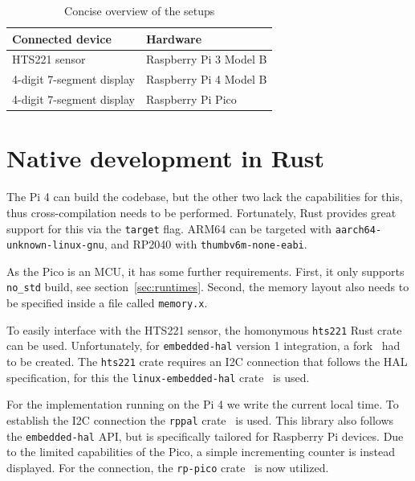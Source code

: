 \begin{table}[h]
	\centering
	\captionsetup{justification=centering}
	\begin{tabular}{l l}
		\toprule
        Connected device & Hardware \\ \midrule
        HTS221 sensor    & Raspberry Pi 3 Model B \\
        4-digit 7-segment display & Raspberry Pi 4 Model B \\
        4-digit 7-segment display & Raspberry Pi Pico \\
		\bottomrule
	\end{tabular}
    \caption{Concise overview of the setups}
	\label{tab:setups}
\end{table}


\section{Native development in Rust}
The Pi 4 can build the codebase, but the other two lack the capabilities for this, thus cross-compilation needs to be performed. Fortunately, Rust provides great support for this via the \texttt{target} flag. ARM64 can be targeted with \texttt{aarch64-unknown-linux-gnu}, and RP2040 with \texttt{thumbv6m-none-eabi}.

As the Pico is an MCU, it has some further requirements. First, it only supports \texttt{no\_std} build, see section~\ref{sec:runtimes}. Second, the memory layout also needs to be specified inside a file called \texttt{memory.x}.

To easily interface with the HTS221 sensor, the homonymous \texttt{hts221} Rust crate~\cite{gh:hts221} can be used. Unfortunately, for \texttt{embedded-hal} version 1 integration, a fork~\cite{gh:hts221-fork} had to be created. The \texttt{hts221} crate requires an I2C connection that follows the HAL specification, for this the \texttt{linux-embedded-hal} crate~\cite{gh:leh} is used.

For the implementation running on the Pi 4 we write the current local time. To establish the I2C connection the \texttt{rppal} crate~\cite{gh:rppal} is used. This library also follows the \texttt{embedded-hal} API, but is specifically tailored for Raspberry Pi devices. Due to the limited capabilities of the Pico, a simple incrementing counter is instead displayed. For the connection, the \texttt{rp-pico} crate~\cite{gh:rppico} is now utilized.  

